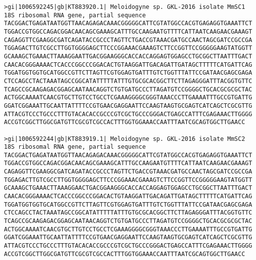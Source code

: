 \documentclass[11pt]{article}
\begin{document}
\begin{Verbatim}[commandchars=\\\{\}]
>gi|1006592245|gb|KT883920.1| Meloidogyne sp. GKL-2016 isolate MmSC1 18S ribosomal RNA gene, partial sequence
TACGGACTGAGATAATGGTTAACAGAGACAAACGGGGGCATTCGTATGGCCACGTGAGAGGTGAAATTCT
TGGACCGTGGCCAGACGGACAACAGCGAAAGCATTTGCCAAGAATGTTTTCATTAATCAAGAACGAAAGT
CAGAGGTTCGAAGGCGATCAGATACCGCCCTAGTTCTGACCGTAAACGATGCCAACTAGCGATCCGCCGA
TGGAGACTTGTCGCCTTGGTGGGGAGCTTCCCGGAAACGAAAGTCTTCCGGTTCCGGGGGAAGTATGGTT
GCAAAGCTGAAACTTAAAGGAATTGACGGAAGGGCACCACCAGGAGTGGAGCCTGCGGCTTAATTTGACT
CAACACGGGAAAACTCACCCGGCCCGGACACTGTAAGGATTGACAGATTGATAGCTTTTTCATGATTCAG
TGGATGGTGGTGCATGGCCGTTCTTAGTTCGTGGAGTGATTTGTCTGGTTTATTCCGATAACGAGCGAGA
CTCCAGCCTACTAAATAGCCGGCATATTTTTATTTGTGCGCACGGCTTCTTAGAGGGATTTACGGTGTTC
TCAGCCGCAAGAGACGGAGCAATAACAGGTCTGTGATGCCCTTAGATGTCCGGGGCTGCACGCGCGCTAC
ACTGGCAAAATCAACGTGCTTGTCCTGCCTCGAAAGGGGCGGGTAAACCCTTGAAAATTTGCCGTGATTG
GGATCGGAAATTGCAATTATTTTCCGTGAACGAGGAATTCCAAGTAAGTGCGAGTCATCAGCTCGCGTTG
ATTACGTCCCTGCCCTTTGTACACACCGCCCGTCGCTGCCCGGGACTGAGCCATTTCGAGAAACTTGGGG
ACCGTCGGCTTGGCGATGTTCGCGTCGCCACTTTGGTGGAAACCAATTTAATCGCAGTGGCTTGAACC

>gi|1006592244|gb|KT883919.1| Meloidogyne sp. GKL-2016 isolate MmSC2 18S ribosomal RNA gene, partial sequence
TACGGACTGAGATAATGGTTAACAGAGACAAACGGGGGCATTCGTATGGCCACGTGAGAGGTGAAATTCT
TGGACCGTGGCCAGACGGACAACAGCGAAAGCATTTGCCAAGAATGTTTTCATTAATCAAGAACGAAAGT
CAGAGGTTCGAAGGCGATCAGATACCGCCCTAGTTCTGACCGTAAACGATGCCAACTAGCGATCCGCCGA
TGGAGACTTGTCGCCTTGGTGGGGAGCTTCCCGGAAACGAAAGTCTTCCGGTTCCGGGGGAAGTATGGTT
GCAAAGCTGAAACTTAAAGGAACTGACGGAAGGGCACCACCAGGAGTGGAGCCTGCGGCTTAATTTGACT
CAACACGGGAAAACTCACCCGGCCCGGACACTGTAAGGATTGACAGATTGATAGCTTTTTCATGATTCAG
TGGATGGTGGTGCATGGCCGTTCTTAGTTCGTGGAGTGATTTGTCTGGTTTATTCCGATAACGAGCGAGA
CTCCAGCCTACTAAATAGCCGGCATATTTTTATTTGTGCGCACGGCTTCTTAGAGGGATTTACGGTGTTC
TCAGCCGCAAGAGACGGAGCAATAACAGGTCTGTGATGCCCTTAGATGTCCGGGGCTGCACGCGCGCTAC
ACTGGCAAAATCAACGTGCTTGTCCTGCCTCGAAAGGGGCGGGTAAACCCTTGAAAATTTGCCGTGATTG
GGATCGGAAATTGCAATTATTTTCCGTGAACGAGGAATTCCAAGTAAGTGCGAGTCATCAGCTCGCGTTG
ATTACGTCCCTGCCCTTTGTACACACCGCCCGTCGCTGCCCGGGACTGAGCCATTTCGAGAAACTTGGGG
ACCGTCGGCTTGGCGATGTTCGCGTCGCCACTTTGGTGGAAACCAATTTAATCGCAGTGGCTTGAACC


\end{Verbatim}
\end{document}
